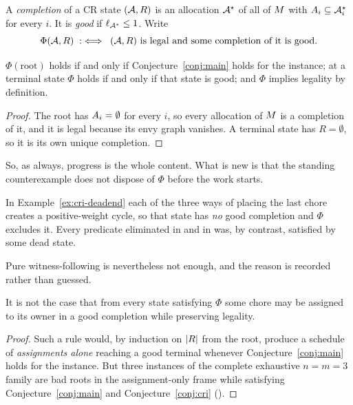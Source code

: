 \begin{definition}[Completion]
\label{def:cri-completion}
A \emph{completion} of a CR state $(\mathcal{A}, R)$ is an allocation $\mathcal{A}^{\star}$
of all of $M$ with $A_{i} \subseteq \mathcal{A}^{\star}_i$ for every $i$. It
is \emph{good} if $\ell_{\mathcal{A}^{\star}} \le 1$. Write
\[
  \Phi(\mathcal{A},R) \;:\iff\; (\mathcal{A},R) \text{ is legal and some completion of it
  is good.}
\]
\end{definition}

\begin{proposition}
\label{prop:cri-phi}
$\Phi(\text{root})$ holds if and only if Conjecture~\ref{conj:main} holds for the
instance; at a terminal state $\Phi$ holds if and only if that state is good; and
$\Phi$ implies legality by definition.
\end{proposition}

\begin{proof}
The root has $A_{i} = \emptyset$ for every $i$, so every allocation of
$M$ is a completion of it, and it is legal because its envy graph vanishes.
A terminal state has $R = \emptyset$, so it is its own unique completion.
\end{proof}

So, as always, progress is the whole content. What is new is that the standing
counterexample does not dispose of $\Phi$ before the work starts.

\begin{observation}
\label{obs:cri-phi-survives}
In Example~\ref{ex:cri-deadend} each of the three ways of placing the last chore
creates a positive-weight cycle, so that state has \emph{no} good completion and
$\Phi$ excludes it. Every predicate eliminated in  and in
 was, by contrast, satisfied by some dead state.
\end{observation}

Pure witness-following is nevertheless not enough, and the reason is recorded
rather than guessed.

\begin{proposition}
\label{prop:cri-follow-fails}
It is not the case that from every state satisfying $\Phi$ some chore may be
assigned to its owner in a good completion while preserving legality.
\end{proposition}

\begin{proof}
Such a rule would, by induction on $\left\lvert R\right\rvert$ from the root, produce a schedule of
\emph{assignments alone} reaching a good terminal whenever
Conjecture~\ref{conj:main} holds for the instance. But three instances of the
complete exhaustive $n = m = 3$ family are bad roots in the assignment-only
frame while satisfying Conjecture~\ref{conj:main} and
Conjecture~\ref{conj:cri} ().
\end{proof}

